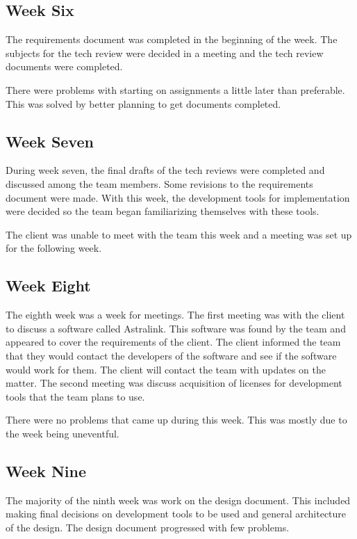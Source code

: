 \documentclass[onecolumn, draftclsnofoot,10pt, compsoc]{IEEEtran}
\begin{document}
\subsection{Week Six}
The requirements document was completed in the beginning of the week.
The subjects for the tech review were decided in a meeting and the tech review documents were completed.\par
There were problems with starting on assignments a little later than preferable.
This was solved by better planning to get documents completed.\par

\subsection{Week Seven}
During week seven, the final drafts of the tech reviews were completed and discussed among the team members.
Some revisions to the requirements document were made.
With this week, the development tools for implementation were decided so the team began familiarizing themselves with these tools.\par
The client was unable to meet with the team this week and a meeting was set up for the following week.\par

\subsection{Week Eight}
The eighth week was a week for meetings.
The first meeting was with the client to discuss a software called Astralink.
This software was found by the team and appeared to cover the requirements of the client.
The client informed the team that they would contact the developers of the software and see if the software would work for them.
The client will contact the team with updates on the matter.
The second meeting was discuss acquisition of licenses for development tools that the team plans to use.\par
There were no problems that came up during this week.
This was mostly due to the week being uneventful.\par

\subsection{Week Nine}
The majority of the ninth week was work on the design document.
This included making final decisions on development tools to be used and general architecture of the design.
The design document progressed with few problems.\par
\end{document}

